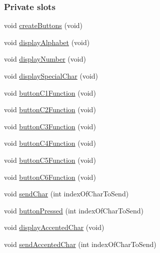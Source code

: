 \subsubsection*{Private slots}
\begin{DoxyCompactItemize}
\item 
void \hyperlink{class_q_virtual_keyboard_a40014922c17ece577edf6192e7ddf060}{create\+Buttons} (void)
\item 
void \hyperlink{class_q_virtual_keyboard_aa8b07e67a633d6bb80a22cbf511993f8}{display\+Alphabet} (void)
\item 
void \hyperlink{class_q_virtual_keyboard_a55b57aad2bd2229accaf251bc9048cec}{display\+Number} (void)
\item 
void \hyperlink{class_q_virtual_keyboard_a2b1d480773f837bd0f781399e6d7db59}{display\+Special\+Char} (void)
\item 
void \hyperlink{class_q_virtual_keyboard_ad5a6d0ff933a561b273549b78c31fd4e}{button\+C1\+Function} (void)
\item 
void \hyperlink{class_q_virtual_keyboard_a9e926203d39d233505ecbc67565701d9}{button\+C2\+Function} (void)
\item 
void \hyperlink{class_q_virtual_keyboard_a0132f341d2cad297611d6aededcdd152}{button\+C3\+Function} (void)
\item 
void \hyperlink{class_q_virtual_keyboard_a5be7b200eacaca5ca767c2e4efd0cb64}{button\+C4\+Function} (void)
\item 
void \hyperlink{class_q_virtual_keyboard_a1a7cc07beec5d32833426a6b3d2ba01a}{button\+C5\+Function} (void)
\item 
void \hyperlink{class_q_virtual_keyboard_af4db06bec2ed47409e9ee9743910c010}{button\+C6\+Function} (void)
\item 
void \hyperlink{class_q_virtual_keyboard_af5a2602fcde26706582fb50c3b28b35b}{send\+Char} (int index\+Of\+Char\+To\+Send)
\item 
void \hyperlink{class_q_virtual_keyboard_a8d59c301c476f98ef168b4da7a30bacf}{button\+Pressed} (int index\+Of\+Char\+To\+Send)
\item 
void \hyperlink{class_q_virtual_keyboard_a6407d7d230617ec40b905f1cc6d7afae}{display\+Accented\+Char} (void)
\item 
void \hyperlink{class_q_virtual_keyboard_a82af8c33e832f7c8173b739a03919d95}{send\+Accented\+Char} (int index\+Of\+Char\+To\+Send)
\end{DoxyCompactItemize}
